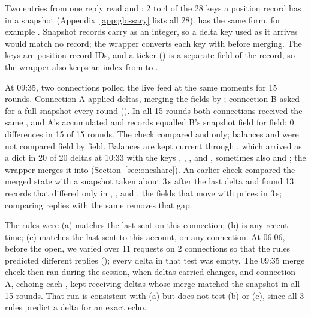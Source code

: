 {\RaggedRight {} Two entries from one reply read  and : 2 to 4 of the 28 keys a position record has in a snapshot (Appendix~\ref{app:glossary} lists all 28).  has the same form, for example . Snapshot records carry  as an integer, so a delta key used as it arrives would match no record; the wrapper converts each key with  before merging. The keys are position record IDs, and a ticker () is a separate field of the record, so the wrapper also keeps an index from  to .\par}

 At 09:35, two connections polled the live feed at the same moments for 15 rounds. Connection A applied deltas, merging the  fields by ; connection B asked for a full snapshot every round (). In all 15 rounds both connections received the same , and A's accumulated  and  records equalled B's snapshot field for field: 0 differences in 15 of 15 rounds. The check compared  and  only; balances and  were not compared field by field. Balances are kept current through , which arrived as a dict in 20 of 20 deltas at 10:33 with the keys , , ,  and , sometimes also  and ; the wrapper merges it into  (Section~\ref{sec:oneshare}). An earlier check compared the merged state with a snapshot taken about 3\,s after the last delta and found 13 records that differed only in , ,  and , the fields that move with prices in 3\,s; comparing replies with the same  removes that gap.

 The rules were (a)  matches the  last sent on this connection; (b)  is any recent time; (c)  matches the  last sent to this account, on any connection. At 06:06, before the open, we varied  over 11 requests on 2 connections so that the rules predicted different replies (); every delta in that test was empty. The 09:35 merge check then ran during the session, when deltas carried changes, and connection A, echoing each , kept receiving deltas whose merge matched the snapshot in all 15 rounds. That run is consistent with (a) but does not test (b) or (c), since all 3 rules predict a delta for an exact echo.

